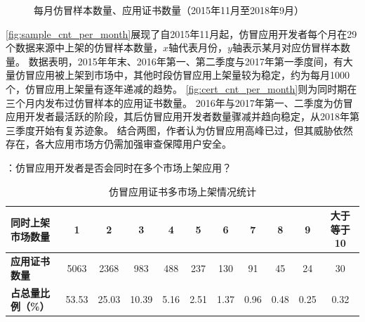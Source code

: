 \begin{figure}[t]
    \centering
    \hfill

    \hfill
    \caption{每月仿冒样本数量、应用证书数量（2015年11月至2018年9月）}
    \label{fig:fake_cnt_per_month}
\end{figure}

\autoref{fig:sample_cnt_per_month}展现了自2015年11月起，仿冒应用开发者每个月在29个数据来源中上架的仿冒样本数量，$x$轴代表月份，$y$轴表示某月对应仿冒样本数量。
数据表明，2015年年末、2016年第一、第二季度与2017年第一季度间，有大量仿冒应用被上架到市场中，其他时段仿冒应用上架量较为稳定，约为每月1000个，仿冒应用上架量有逐年递减的趋势。
\autoref{fig:cert_cnt_per_month}则为同时期在三个月内发布过仿冒样本的应用证书数量。
2016年与2017年第一、二季度为仿冒应用开发者最活跃的阶段，其后仿冒应用开发者数量骤减并趋向稳定，从2018年第三季度开始有复苏迹象。
结合两图，作者认为仿冒应用高峰已过，但其威胁依然存在，各大应用市场方仍需加强审查保障用户安全。

：仿冒应用开发者是否会同时在多个市场上架应用？

\begin{table}[htbp]
    \renewcommand{\arraystretch}{1}
    \footnotesize
    \centering
    \caption{仿冒应用证书多市场上架情况统计}
    \vspace{1mm}
    \begin{tabular}{l cccccccccc}
        \toprule
        {\bf 同时上架市场数量} & 1     & 2     & 3     & 4    & 5    & 6    & 7    & 8    & 9    & 大于等于10 \\
        \midrule
        {\bf 应用证书数量}     & 5063  & 2368  & 983   & 488  & 237  & 130  & 91   & 45   & 24   & 30         \\
        {\bf 占总量比例（\%）} & 53.53 & 25.03 & 10.39 & 5.16 & 2.51 & 1.37 & 0.96 & 0.48 & 0.25 & 0.32       \\
        \bottomrule
    \end{tabular}
    \label{table:multi_market_statistic}
\end{table}

